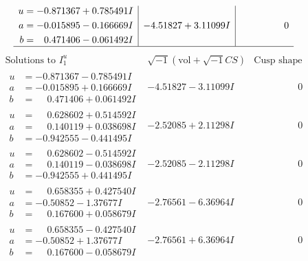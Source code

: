 \documentclass[1p]{elsarticle_modified}
\theoremstyle{definition}
\newcommand{\I}{\sqrt{-1}}
\begin{document}
$$\begin{array}{c|c|c}
\begin{aligned}
u &= -0.871367 + 0.785491 I \\
a &= -0.015895 - 0.166669 I \\
b &= \phantom{-}0.471406 - 0.061492 I\end{aligned}
 & -4.51827 + 3.11099 I & \phantom{-0.000000 } 0\\
 \hline 
 \end{array}$$\newpage$$\begin{array}{c|c|c}  
\text{Solutions to }I^u_{1}& \I (\text{vol} + \sqrt{-1}CS) & \text{Cusp shape}\\
 \hline 
\begin{aligned}
u &= -0.871367 - 0.785491 I \\
a &= -0.015895 + 0.166669 I \\
b &= \phantom{-}0.471406 + 0.061492 I\end{aligned}
 & -4.51827 - 3.11099 I & \phantom{-0.000000 } 0 \\ \hline\begin{aligned}
u &= \phantom{-}0.628602 + 0.514592 I \\
a &= \phantom{-}0.140119 + 0.038698 I \\
b &= -0.942555 - 0.441495 I\end{aligned}
 & -2.52085 + 2.11298 I & \phantom{-0.000000 } 0 \\ \hline\begin{aligned}
u &= \phantom{-}0.628602 - 0.514592 I \\
a &= \phantom{-}0.140119 - 0.038698 I \\
b &= -0.942555 + 0.441495 I\end{aligned}
 & -2.52085 - 2.11298 I & \phantom{-0.000000 } 0 \\ \hline\begin{aligned}
u &= \phantom{-}0.658355 + 0.427540 I \\
a &= -0.50852 - 1.37677 I \\
b &= \phantom{-}0.167600 + 0.058679 I\end{aligned}
 & -2.76561 - 6.36964 I & \phantom{-0.000000 } 0 \\ \hline\begin{aligned}
u &= \phantom{-}0.658355 - 0.427540 I \\
a &= -0.50852 + 1.37677 I \\
b &= \phantom{-}0.167600 - 0.058679 I\end{aligned}
 & -2.76561 + 6.36964 I & \phantom{-0.000000 } 0 \\ \hline\begin{aligned}

\end{aligned}
\end{array}$$
\end{document}
